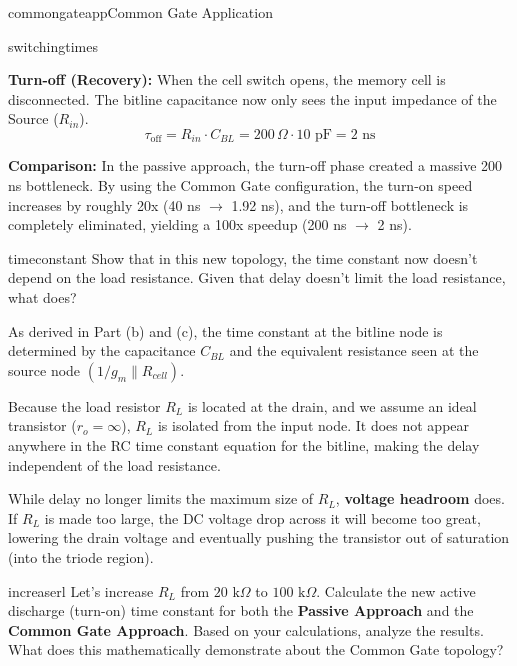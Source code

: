 \begin{mainquestion}{commongateapp}{Common Gate Application}
\begin{partquestion}{switchingtimes}
\begin{answer}[3.5in]
    \vspace{1em}
    \textbf{Turn-off (Recovery):}
    When the cell switch opens, the memory cell is disconnected. The bitline capacitance now only sees the input impedance of the Source ($R_{in}$).
    \[\tau_{\text{off}} = R_{in} \cdot C_{BL} = 200\,\Omega \cdot 10\text{ pF} = 2\text{ ns}\]
    
    \vspace{1em}
    \textbf{Comparison:}
    In the passive approach, the turn-off phase created a massive 200 ns bottleneck. By using the Common Gate configuration, the turn-on speed increases by roughly 20x (40 ns $\rightarrow$ 1.92 ns), and the turn-off bottleneck is completely eliminated, yielding a 100x speedup (200 ns $\rightarrow$ 2 ns).
\end{answer}

\end{partquestion}

\begin{partquestion}{timeconstant}
{Show that in this new topology, the time constant now doesn't depend on the load resistance. Given that delay doesn't limit the load resistance, what does?}

\begin{answer}[3in]
    As derived in Part (b) and (c), the time constant at the bitline node is determined by the capacitance $C_{BL}$ and the equivalent resistance seen at the source node $(1/g_m \parallel R_{cell})$. 
    
    Because the load resistor $R_L$ is located at the drain, and we assume an ideal transistor ($r_o = \infty$), $R_L$ is isolated from the input node. It does not appear anywhere in the RC time constant equation for the bitline, making the delay independent of the load resistance. 
    
    While delay no longer limits the maximum size of $R_L$, \textbf{voltage headroom} does. If $R_L$ is made too large, the DC voltage drop across it will become too great, lowering the drain voltage and eventually pushing the transistor out of saturation (into the triode region).
\end{answer}

\pagebreak
\end{partquestion}

\begin{partquestion}{increaserl}
{Let's increase $R_L$ from $20\text{ k}\Omega$ to $100\text{ k}\Omega$. Calculate the new active discharge (turn-on) time constant for both the \textbf{Passive Approach} and the \textbf{Common Gate Approach}. Based on your calculations, analyze the results. What does this mathematically demonstrate about the Common Gate topology?}


\end{partquestion}
\end{mainquestion}
